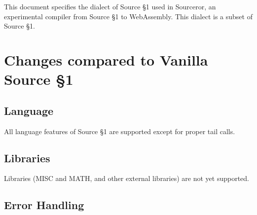 

\newcommand{\Rule}[2]{\genfrac{}{}{0.7pt}{}{{\setlength{\fboxrule}{0pt}\setlength{\fboxsep}{3mm}\fbox{$#1$}}}{{\setlength{\fboxrule}{0pt}\setlength{\fboxsep}{3mm}\fbox{$#2$}}}}

\newcommand{\TruE}{\textbf{\texttt{true}}}
\newcommand{\FalsE}{\textbf{\texttt{false}}}
\newcommand{\Rc}{\texttt{\}}}
\newcommand{\Lc}{\texttt{\{}}
\newcommand{\Rp}{\texttt{)}}
\newcommand{\Lp}{\texttt{(}}
\newcommand{\Fun}{\textbf{\texttt{function}}}
\newcommand{\Let}{\textbf{\texttt{let}}}
\newcommand{\Return}{\textbf{\texttt{return}}}
\newcommand{\Const}{\textbf{\texttt{const}}}
\newcommand{\If}{\textbf{\texttt{if}}}
\newcommand{\Else}{\textbf{\texttt{else}}}
\newcommand{\Bool}{\texttt{bool}}
\newcommand{\Number}{\texttt{number}}
\newcommand{\String}{\texttt{string}}
\newcommand{\Undefined}{\texttt{undefined}}

\newtheorem{definition}{Definition}[section]



This document specifies the dialect of Source \S 1 used in Sourceror, an experimental compiler from Source \S 1 to WebAssembly.  This dialect is a subset of Source \S 1.

\section*{Changes compared to Vanilla Source \S 1}

\subsection*{Language}  

All language features of Source \S 1 are supported except for proper tail calls.

\subsection*{Libraries}

Libraries (MISC and MATH, and other external libraries) are not yet supported.

\subsection*{Error Handling}

